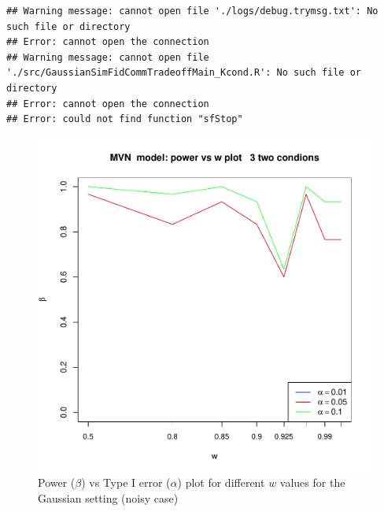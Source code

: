 \documentclass[11pt]{article} %
\begin{document}
\begin{knitrout}
\color{fgcolor}\begin{kframe}
\begin{verbatim}
## Warning message: cannot open file './logs/debug.trymsg.txt': No such file or directory
## Error: cannot open the connection
## Warning message: cannot open file './src/GaussianSimFidCommTradeoffMain_Kcond.R': No such file or directory
## Error: cannot open the connection
## Error: could not find function "sfStop"
\end{verbatim}
\end{kframe}
\end{knitrout}





\begin{figure}
\includegraphics[scale=0.95]{OOSMVN-power-w-c0-01-3-cond.pdf}
\caption{Power ($\beta$) vs Type I error ($\alpha$) plot for different $w$ values for the Gaussian setting (noisy case)}
\label{fig:MVN-c001-ROC-Kcond}
\end{figure}
\end{document}
